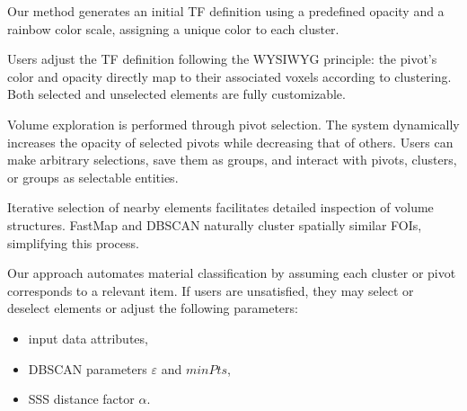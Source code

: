 Our method generates an initial TF definition using a predefined opacity and a rainbow color scale, assigning a unique color to each cluster.

Users adjust the TF definition following the WYSIWYG principle: the pivot’s color and opacity directly map to their associated voxels according to clustering. Both selected and unselected elements are fully customizable.

Volume exploration is performed through pivot selection. The system dynamically increases the opacity of selected pivots while decreasing that of others. Users can make arbitrary selections, save them as groups, and interact with pivots, clusters, or groups as selectable entities.

Iterative selection of nearby elements facilitates detailed inspection of volume structures. FastMap and DBSCAN naturally cluster spatially similar FOIs, simplifying this process.

Our approach automates material classification by assuming each cluster or pivot corresponds to a relevant item. If users are unsatisfied, they may select or deselect elements or adjust the following parameters:

\begin{itemize}
    \item input data attributes,
    \item DBSCAN parameters $\varepsilon$ and $minPts$,
    \item SSS distance factor $\alpha$.
\end{itemize}
